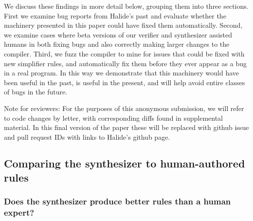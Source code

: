 \documentclass[acmsmall,review,anonymous]{acmart}\settopmatter{printfolios=true,printccs=false,printacmref=false}
\begin{document}
We discuss these findings in more detail below, grouping them into three sections. First we examine bug reports from Halide’s past and evaluate whether the machinery presented in this paper could have fixed them automatically. Second, we examine cases where beta versions of our verifier and synthesizer assisted humans in both fixing bugs and also correctly making larger changes to the compiler. Third, we fuzz the compiler to mine for issues that could be fixed with new simplifier rules, and automatically fix them before they ever appear as a bug in a real program. In this way we demonstrate that this machinery would have been useful in the past, is useful in the present, and will help avoid entire classes of bugs in the future.

Note for reviewers: For the purposes of this anonymous submission, we will refer to code changes by letter, with corresponding diffs found in supplemental material. In this final version of the paper these will be replaced with github issue and pull request IDs with links to Halide’s github page.

\subsection{Comparing the synthesizer to human-authored rules}

\subsubsection{Does the synthesizer produce better rules than a human expert?}
\label{sub:bugfixes}



\end{document}
